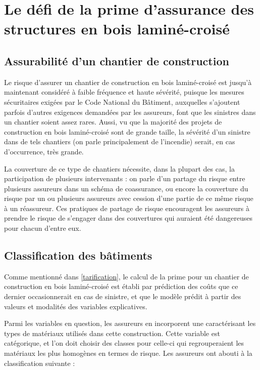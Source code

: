 \documentclass[11pt]{article}
\begin{document}
\section{Le défi de la prime d'assurance des structures en bois laminé-croisé}

\subsection{Assurabilité d'un chantier de construction}

Le risque d'assurer un chantier de construction en bois laminé-croisé est jusqu'à maintenant considéré à faible fréquence et haute sévérité, puisque les mesures sécuritaires exigées par le Code National du Bâtiment, auxquelles s'ajoutent parfois d'autres exigences demandées par les assureurs, font que les sinistres dans un chantier soient assez rares. Aussi, vu que la majorité des projets de construction en bois laminé-croisé sont de grande taille, la sévérité d'un sinistre dans de tels chantiers (on parle principalement de l'incendie) serait, en cas d'occurrence, très grande.

La couverture de ce type de chantiers nécessite, dans la plupart des cas, la participation de plusieurs intervenants : on parle d'un partage du risque entre plusieurs assureurs dans un schéma de coassurance, ou encore la couverture du risque par un ou plusieurs assureurs avec cession d'une partie de ce même risque à un réassureur. Ces pratiques de partage de risque encouragent les assureurs à prendre le risque de s'engager dans des couvertures qui auraient été dangereuses pour chacun d'entre eux.


\subsection{Classification des bâtiments}

Comme mentionné dans \ref{tarification}, le calcul de la prime pour un chantier de construction en bois laminé-croisé est établi par prédiction des coûts que ce dernier occasionnerait en cas de sinistre, et que le modèle prédit à partir des valeurs et modalités des variables explicatives. 

Parmi les variables en question, les assureurs en incorporent une caractérisant les types de matériaux utilisés dans cette construction. Cette variable est catégorique, et l'on doit choisir des classes pour celle-ci qui regrouperaient les matériaux les plus homogènes en termes de risque. Les assureurs ont abouti à la classification suivante :
\end{document}
